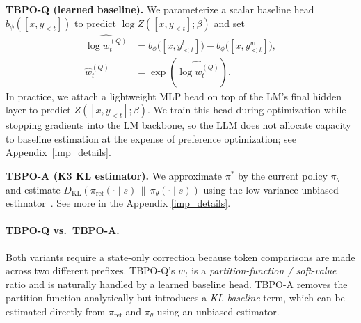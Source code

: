 \documentclass{article}
\theoremstyle{plain}
\theoremstyle{definition}
\theoremstyle{remark}
\begin{document}
\textbf{TBPO-Q (learned baseline).}
We parameterize a scalar baseline head $b_\phi([x,y_{<t}])$ to predict
$\log Z([x,y_{<t}];\beta)$ and set
\[
\begin{aligned}
\widehat{\log w_t^{(Q)}} 
&= b_\phi\big([x, y^l_{<t}]\big)
 - b_\phi\big([x, y^w_{<t}]\big), \\
\hat w_t^{(Q)} 
&= \exp\!\left(\widehat{\log w_t^{(Q)}}\right).
\end{aligned}
\]
In practice, we attach a lightweight MLP head on top of the LM's final hidden layer to predict $Z([x, y_{<t}]; \beta)$. We train this head during optimization while stopping gradients into the LM backbone, so the LLM does not allocate capacity to baseline estimation at the expense of preference optimization; see Appendix~\ref{imp_details}.

\textbf{TBPO-A (K3 KL estimator).}
We approximate $\pi^*$ by the current policy $\pi_\theta$ and estimate
$D_{\mathrm{KL}}(\pi_{\mathrm{ref}}(\cdot\mid s)\,\|\,\pi_\theta(\cdot\mid s))$
using the low-variance unbiased estimator~\citep{Schulman2020ApproximatingKL}. See more in the Appendix \ref{imp_details}.

\paragraph{TBPO-Q vs.\ TBPO-A.}
Both variants require a state-only correction because token comparisons are made across two
different prefixes.
TBPO-Q’s $w_t$ is a \emph{partition-function / soft-value} ratio and is naturally handled
by a learned baseline head.
TBPO-A removes the partition function analytically but introduces a \emph{KL-baseline} term,
which can be estimated directly from $\pi_{\mathrm{ref}}$ and $\pi_\theta$ using an unbiased estimator.

\newcommand{\mstd}[2]{#1$_{\pm #2}$}
\newcommand{\best}[1]{\textbf{#1}}
\newcommand{\second}[1]{\underline{#1}}
\end{document}

